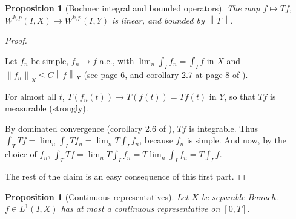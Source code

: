 \documentclass[english,a4paper,9pt,oneside]{scrbook}	%
\theoremstyle{break}
\newtheorem{cor}[equation]{Corollary}
\newtheorem{prop}[equation]{Proposition}
\newenvironment{mproof}[1][\proofname]{%
  \begin{proof}[#1]$ $\par\nobreak\ignorespaces
}{%
  \end{proof}
}
\renewcommand*{\proofname}{Proof}
\theoremstyle{remark}
\newcommand{\mR}{\mathbb{R}}
\newcommand{\norm}[1]{\left\lVert#1\right\rVert}
\begin{document}
\begin{appendices}
\begin{prop}[Bochner integral and bounded operators]
The map $f \mapsto Tf$, $W^{k,p}(I,X)\rightarrow W^{k,p}(I,Y)$ is linear, and bounded by $\norm{T}$.

\end{prop}
\begin{mproof}

Let $f_n$ be simple, $f_n\rightarrow f $ a.e., with $\lim_n \int_I f_n = \int_I f$ in $X$ and $\norm{f_n}_X \leq C \norm{f}_X$ (see page 6, and corollary 2.7 at page 8 of \cite{kreuter}).

For almost all $t$, $T(f_n(t)) \rightarrow T(f(t))=Tf(t)$ in $Y$, so that $Tf$ is measurable (strongly).

By dominated convergence (corollary 2.6 of \cite{kreuter}), $Tf$ is integrable. Thus $\int_T Tf = \lim_n \int_I  Tf_n = \lim_n T\int_I  f_n$, because $f_n$ is simple. And now, by the choice of $f_n$, $\int_T Tf = \lim_n T\int_I  f_n = T \lim_n \int_I  f_n = T \int_I f$.

The rest of the claim is an easy consequence of this first part.
\end{mproof}

%
%
%
%
%

\begin{prop}[Continuous representatives]
\label{prop:cts_repr}
Let $X$ be separable Banach. $f \in L^1(I,X)$ has at most a continuous representative on $[0,T]$.
\end{prop}


\end{appendices}
\end{document}
